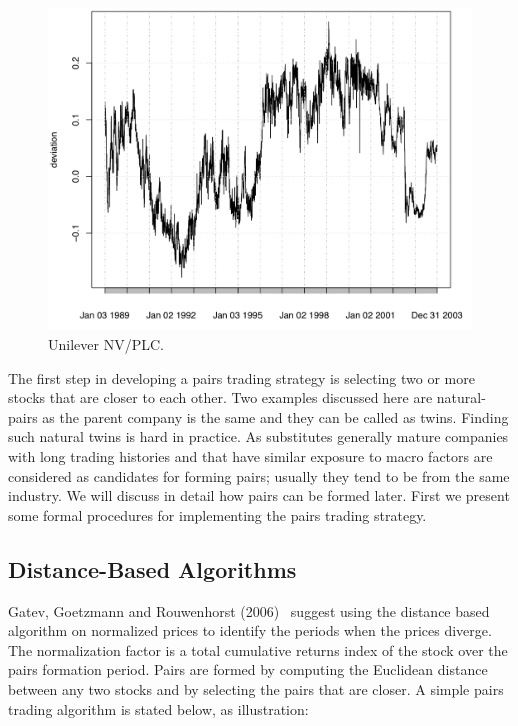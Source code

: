 	\begin{figure}[!ht]
	\centering
	\includegraphics[width=\textwidth]{chapters/chapter_stat_ts/figures/472.png}
	\caption{Unilever NV/PLC. \label{fig:3nvplc}}
	\end{figure}

The first step in developing a pairs trading strategy is selecting two or more stocks that are closer to each other. Two examples discussed here are natural-pairs as the parent company is the same and they can be called as twins. Finding such natural twins is hard in practice. As substitutes generally mature companies with long trading histories and that have similar exposure to macro factors are considered as candidates for forming pairs; usually they tend to be from the same industry. We will discuss in detail how pairs can be formed later. First we present some formal procedures for implementing the pairs trading strategy.



\subsection{Distance-Based Algorithms}


Gatev, Goetzmann and Rouwenhorst (2006)~\cite{ggr} suggest using the distance based algorithm on normalized prices to identify the periods when the prices diverge. The normalization factor is a total cumulative returns index of the stock over the pairs formation period. Pairs are formed by computing the Euclidean distance between any two stocks and by selecting the pairs that are closer. A simple pairs trading algorithm is stated below, as illustration: \\

